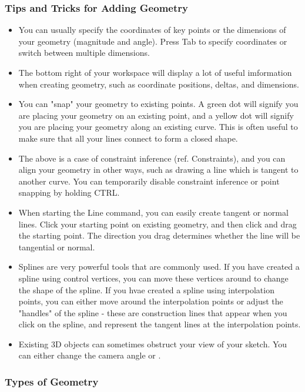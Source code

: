 \subsubsection{Tips and Tricks for Adding Geometry}
\begin{itemize}
    \item You can usually specify the coordinates of key points or the dimensions of your geometry (magnitude and angle). Press Tab to specify coordinates or switch between multiple dimensions.
    \item The bottom right of your workspace will display a lot of useful imformation when creating geometry, such as coordinate positions, deltas, and dimensions.
    \item You can "snap" your geometry to existing points. A green dot will signify you are placing your geometry on an existing point, and a yellow dot will signify you are placing your geometry along an existing curve. This is often useful to make sure that all your lines connect to form a closed shape.
    \item The above is a case of constraint inference (ref. Constraints), and you can align your geometry in other ways, such as drawing a line which is tangent to another curve. You can temporarily disable constraint inference or point snapping by holding CTRL.
    \item When starting the Line command, you can easily create tangent or normal lines. Click your starting point on existing geometry, and then click and drag the starting point. The direction you drag determines whether the line will be tangential or normal.
    \item Splines are very powerful tools that are commonly used. If you have created a spline using control vertices, you can move these vertices around to change the shape of the spline. If you hvae created a spline using interpolation points, you can either move around the interpolation points or adjust the "handles" of the spline - these are construction lines that appear when you click on the spline, and represent the tangent lines at the interpolation points.
    \item Existing 3D objects can sometimes obstruct your view of your sketch. You can either change the camera angle or .
\end{itemize}

\subsubsection{Types of Geometry}


